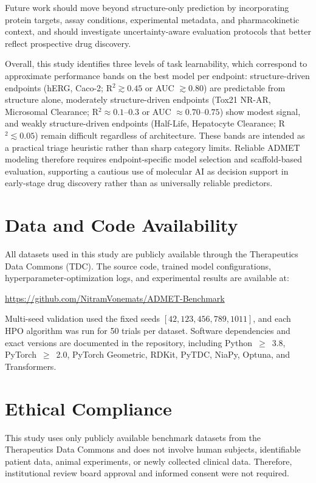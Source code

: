 \documentclass[journal]{IEEEtran}
\begin{document}
Future work should move beyond structure-only prediction by incorporating protein targets, assay conditions, experimental metadata, and pharmacokinetic context, and should investigate uncertainty-aware evaluation protocols that better reflect prospective drug discovery.

Overall, this study identifies three levels of task learnability, which correspond to approximate performance bands on the best model per endpoint: structure-driven endpoints (hERG, Caco-2; R$^2 \gtrsim 0.45$ or AUC $\gtrsim 0.80$) are predictable from structure alone, moderately structure-driven endpoints (Tox21 NR-AR, Microsomal Clearance; R$^2 \approx 0.1$--$0.3$ or AUC $\approx 0.70$--$0.75$) show modest signal, and weakly structure-driven endpoints (Half-Life, Hepatocyte Clearance; R$^2 \lesssim 0.05$) remain difficult regardless of architecture. These bands are intended as a practical triage heuristic rather than sharp category limits. Reliable ADMET modeling therefore requires endpoint-specific model selection and scaffold-based evaluation, supporting a cautious use of molecular AI as decision support in early-stage drug discovery rather than as universally reliable predictors.


\section*{Data and Code Availability}
All datasets used in this study are publicly available through the Therapeutics Data Commons (TDC). The source code, trained model configurations, hyperparameter-optimization logs, and experimental results are available at:
\begin{center}
\url{https://github.com/NitramVonemats/ADMET-Benchmark}
\end{center}

Multi-seed validation used the fixed seeds $[42, 123, 456, 789, 1011]$, and each HPO algorithm was run for 50 trials per dataset. Software dependencies and exact versions are documented in the repository, including Python~$\geq$~3.8, PyTorch~$\geq$~2.0, PyTorch Geometric, RDKit, PyTDC, NiaPy, Optuna, and Transformers.

\section*{Ethical Compliance}
This study uses only publicly available benchmark datasets from the Therapeutics Data Commons and does not involve human subjects, identifiable patient data, animal experiments, or newly collected clinical data. Therefore, institutional review board approval and informed consent were not required.



\end{document}
